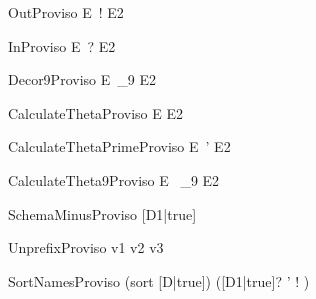 \documentclass{article}
\newcommand{\unprefix}{\mathrel{unprefix}}
\begin{document}
\begin{zedproviso}{OutProviso}
  E~! \is E2
\end{zedproviso}

\begin{zedproviso}{InProviso}
  E~? \is E2
\end{zedproviso}

\begin{zedproviso}{Decor9Proviso}
  E~_9 \is E2
\end{zedproviso}

\begin{zedproviso}{CalculateThetaProviso}
  \theta E \is E2
\end{zedproviso}

\begin{zedproviso}{CalculateThetaPrimeProviso}
  \theta E~' \is E2
\end{zedproviso}

\begin{zedproviso}{CalculateTheta9Proviso}
  \theta E~ _9 \is E2
\end{zedproviso}

\begin{zedproviso}{SchemaMinusProviso}
  [D1|true] \schemaminus [D2|true] \is [D3|true]
\end{zedproviso}

\begin{zedproviso}{UnprefixProviso}
  v1 \unprefix v2 \is v3
\end{zedproviso}

\begin{zedproviso}{SortNamesProviso}
  (sort [D|true]) \is ([D1|true]? \land [D2|true]' \land
                       [D3|true]! \land [D4|true])
\end{zedproviso}
\end{document}
